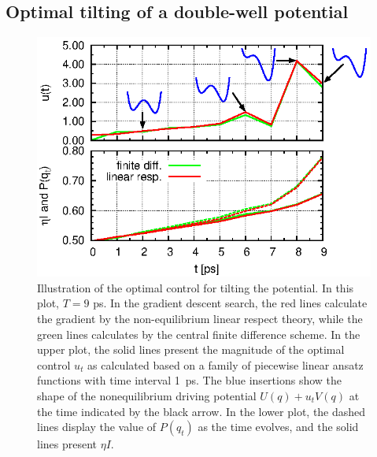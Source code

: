 \documentclass[]{tMPH2e}
\begin{document}
\subsection{Optimal tilting of a double-well potential}
\begin{figure}
  \centering
  \includegraphics[]{figs/fig-ctr-stat-2.eps}
  \caption{Illustration of the optimal control for tilting the potential.  
    In this plot, $T=9$ ps.  In the gradient descent search, the
    red lines  calculate
    the gradient by the non-equilibrium linear respect theory, while
    the green lines calculates by the central finite difference scheme.
 In the upper plot, the solid lines present the magnitude
    of the optimal control $u_t$ as calculated based on a family of
    piecewise linear ansatz functions with time interval 1~ps.
    The blue insertions show the shape of the
    nonequilibrium driving potential $U( q) + u_t V(
    q)$ at the time indicated by the black arrow.  In the lower plot, the
    dashed lines display the value of $P(q_t)$ as the time
    evolves,  and the solid lines present $\eta I$.  }\label{fig:tmp7}
\end{figure}
\end{document}
